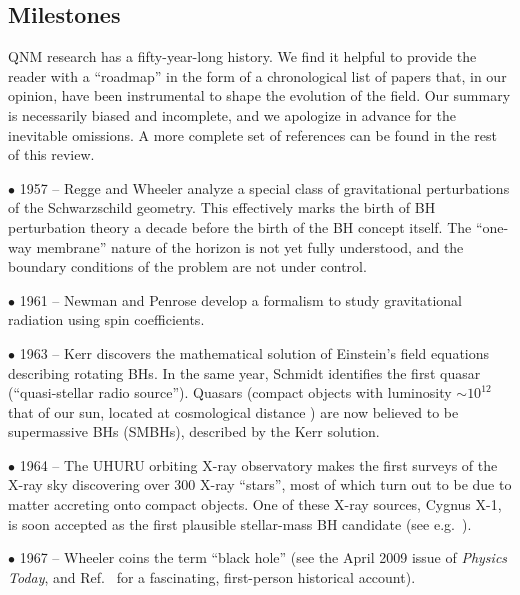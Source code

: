 \documentclass[]{iopart}
\begin{document}
\subsection{Milestones }

QNM research has a fifty-year-long history. We find it helpful to provide the
reader with a ``roadmap'' in the form of a chronological list of papers that,
in our opinion, have been instrumental to shape the evolution of the
field. Our summary is necessarily biased and incomplete, and we apologize in
advance for the inevitable omissions. A more complete set of references can be
found in the rest of this review.

\noindent $\bullet$ 1957 -- Regge and Wheeler \cite{Regge:1957rw} analyze a
special class of gravitational perturbations of the Schwarzschild
geometry. This effectively marks the birth of BH perturbation theory a decade
before the birth of the BH concept itself. The ``one-way membrane'' nature of
the horizon is not yet fully understood, and the boundary conditions of the
problem are not under control.

\noindent $\bullet$ 1961 -- Newman and Penrose \cite{Newman:1961qr} develop a
formalism to study gravitational radiation using spin coefficients. 

\noindent $\bullet$ 1963 -- Kerr \cite{Kerr:1963ud} discovers the mathematical
solution of Einstein's field equations describing rotating BHs. In the same
year, Schmidt identifies the first quasar (``quasi-stellar radio
source''). Quasars (compact objects with luminosity $\sim 10^{12}$ that of our
sun, located at cosmological distance \cite{Schmidt:1963}) are now believed to
be supermassive BHs (SMBHs), described by the Kerr solution.

\noindent $\bullet$ 1964 -- The UHURU orbiting X-ray observatory makes the
first surveys of the X-ray sky discovering over 300 X-ray ``stars'', most of
which turn out to be due to matter accreting onto compact objects. One of
these X-ray sources, Cygnus X-1, is soon accepted as the first plausible
stellar-mass BH candidate (see e.g.~\cite{Bolton:1972}).

\noindent $\bullet$ 1967 -- Wheeler \cite{Ruffini:1971,wheeler} coins the term
``black hole'' (see the April 2009 issue of {\em Physics Today}, and
Ref.~\cite{Wheeler:1998vs} for a fascinating, first-person historical
account).
\end{document}
